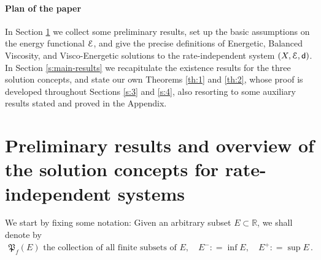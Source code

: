\documentclass[a4paper,10pt,reqno]{amsart} %
\newcommand{\R}{\mathbb{R}}
\numberwithin{equation}{section}
\newcommand{\Xs}{X}
\newcommand{\mdn}{\mathsf{d}}
\newcommand{\RIS}{(\Xs,\calE,\mdn)}
\begin{document}
\paragraph{\bf Plan of the paper} In Section \ref{s:2} we collect some preliminary results, set up the basic assumptions on the energy functional ${\mathcal E}$, and give the precise definitions of Energetic, Balanced Viscosity, and Visco-Energetic solutions to the rate-independent system $\RIS$. In Section \ref{s:main-results} we recapitulate the existence results for the three solution concepts, and state our own Theorems \ref{th:1} and \ref{th:2}, whose proof is developed throughout Sections \ref{s:3} and \ref{s:4}, also resorting to some auxiliary results stated and proved in the Appendix.
\section{Preliminary results and overview of the   solution concepts for rate-independent systems}
\label{s:2}
We start by fixing some notation:
Given an arbitrary subset $E\subset \R$, we shall denote by 
\begin{equation}
\label{notation-set}
\begin{aligned}
\mathfrak{P}_f(E) \text{ the collection of all finite subsets of } E,
\quad
E^-: = \inf E, \quad E^+: = \sup E\,.
\end{aligned}
\end{equation}
\end{document}
